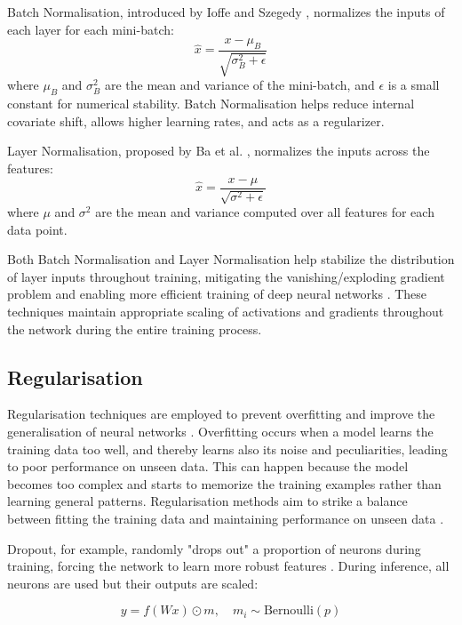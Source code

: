 \documentclass[a4paper, oneside]{discothesis}
\begin{document}
Batch Normalisation, introduced by Ioffe and Szegedy \cite{ioffe2015batch}, normalizes the inputs of each layer for each mini-batch:
\begin{equation}
    \hat{x} = \frac{x - \mu_B}{\sqrt{\sigma_B^2 + \epsilon}}
\end{equation}
where $\mu_B$ and $\sigma_B^2$ are the mean and variance of the mini-batch, and $\epsilon$ is a small constant for numerical stability. Batch Normalisation helps reduce internal covariate shift, allows higher learning rates, and acts as a regularizer.

Layer Normalisation, proposed by Ba et al. \cite{ba2016layer}, normalizes the inputs across the features:
\begin{equation}
    \hat{x} = \frac{x - \mu}{\sqrt{\sigma^2 + \epsilon}}
\end{equation}
where $\mu$ and $\sigma^2$ are the mean and variance computed over all features for each data point.

Both Batch Normalisation and Layer Normalisation help stabilize the distribution of layer inputs throughout training, mitigating the vanishing/exploding gradient problem and enabling more efficient training of deep neural networks \cite{santurkar2018does}. These techniques maintain appropriate scaling of activations and gradients throughout the network during the entire training process.

\subsection{Regularisation}

Regularisation techniques are employed to prevent overfitting and improve the generalisation of neural networks \cite{goodfellow2016deep}. Overfitting occurs when a model learns the training data too well, and thereby learns also its noise and peculiarities, leading to poor performance on unseen data. This can happen because the model becomes too complex and starts to memorize the training examples rather than learning general patterns. Regularisation methods aim to strike a balance between fitting the training data and maintaining performance on unseen data \cite{bishop2006pattern}.

Dropout, for example, randomly "drops out" a proportion of neurons during training, forcing the network to learn more robust features \cite{srivastava2014dropout}. During inference, all neurons are used but their outputs are scaled:

\begin{equation}
    y = f(Wx) \odot m, \quad m_i \sim \text{Bernoulli}(p)
\end{equation}
\end{document}
